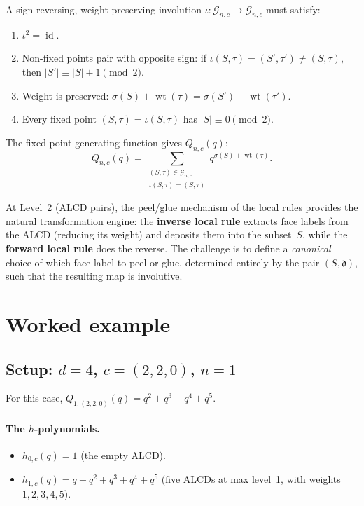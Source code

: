 \documentclass[11pt]{article}
\theoremstyle{plain}
\theoremstyle{definition}
\begin{document}
A sign-reversing, weight-preserving involution
$\iota\colon \mathcal{G}_{n,c} \to \mathcal{G}_{n,c}$ must satisfy:
\begin{enumerate}
  \item $\iota^2 = \operatorname{id}$.
  \item Non-fixed points pair with opposite sign: if
    $\iota(S, \tau) = (S', \tau') \neq (S, \tau)$,
    then $|S'| \equiv |S| + 1 \pmod{2}$.
  \item Weight is preserved:
    $\sigma(S) + \operatorname{wt}(\tau)
    = \sigma(S') + \operatorname{wt}(\tau')$.
  \item Every fixed point $(S, \tau) = \iota(S, \tau)$ has
    $|S| \equiv 0 \pmod{2}$.
\end{enumerate}

The fixed-point generating function gives $Q_{n,c}(q)$:
\[
  Q_{n,c}(q) = \sum_{\substack{(S,\tau) \in \mathcal{G}_{n,c} \\
  \iota(S,\tau) = (S,\tau)}} q^{\sigma(S) + \operatorname{wt}(\tau)}.
\]

At Level~2 (ALCD pairs), the peel/glue mechanism of the local rules
provides the natural transformation engine: the \textbf{inverse local
rule} extracts face labels from the ALCD (reducing its weight) and
deposits them into the subset~$S$, while the \textbf{forward local rule}
does the reverse.  The challenge is to define a \emph{canonical} choice
of which face label to peel or glue, determined entirely by the pair
$(S, \mathfrak{d})$, such that the resulting map is involutive.


\section{Worked example}
\label{sec:example}

\subsection{Setup: $d = 4$, $c = (2,2,0)$, $n = 1$}

For this case, $Q_{1,(2,2,0)}(q) = q^2 + q^3 + q^4 + q^5$.

\paragraph{The $h$-polynomials.}
\begin{itemize}
  \item $h_{0,c}(q) = 1$ (the empty ALCD).
  \item $h_{1,c}(q) = q + q^2 + q^3 + q^4 + q^5$
    (five ALCDs at max level~1, with weights $1, 2, 3, 4, 5$).
\end{itemize}
\end{document}
